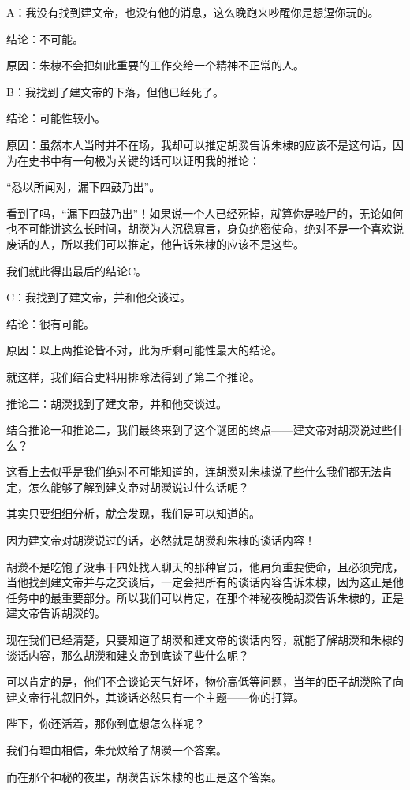 \begin{multicols}{\theparacolNo}
A：我没有找到建文帝，也没有他的消息，这么晚跑来吵醒你是想逗你玩的。

结论：不可能。

原因：朱棣不会把如此重要的工作交给一个精神不正常的人。

B：我找到了建文帝的下落，但他已经死了。

结论：可能性较小。

原因：虽然本人当时并不在场，我却可以推定胡濙告诉朱棣的应该不是这句话，因为在史书中有一句极为关键的话可以证明我的推论：

“悉以所闻对，漏下四鼓乃出”。

看到了吗，“漏下四鼓乃出”！如果说一个人已经死掉，就算你是验尸的，无论如何也不可能讲这么长时间，胡濙为人沉稳寡言，身负绝密使命，绝对不是一个喜欢说废话的人，所以我们可以推定，他告诉朱棣的应该不是这些。

我们就此得出最后的结论C。

C：我找到了建文帝，并和他交谈过。

结论：很有可能。

原因：以上两推论皆不对，此为所剩可能性最大的结论。

就这样，我们结合史料用排除法得到了第二个推论。

推论二：胡濙找到了建文帝，并和他交谈过。

结合推论一和推论二，我们最终来到了这个谜团的终点——建文帝对胡濙说过些什么？

这看上去似乎是我们绝对不可能知道的，连胡濙对朱棣说了些什么我们都无法肯定，怎么能够了解到建文帝对胡濙说过什么话呢？

其实只要细细分析，就会发现，我们是可以知道的。

因为建文帝对胡濙说过的话，必然就是胡濙和朱棣的谈话内容！

胡濙不是吃饱了没事干四处找人聊天的那种官员，他肩负重要使命，且必须完成，当他找到建文帝并与之交谈后，一定会把所有的谈话内容告诉朱棣，因为这正是他任务中的最重要部分。所以我们可以肯定，在那个神秘夜晚胡濙告诉朱棣的，正是建文帝告诉胡濙的。

现在我们已经清楚，只要知道了胡濙和建文帝的谈话内容，就能了解胡濙和朱棣的谈话内容，那么胡濙和建文帝到底谈了些什么呢？

可以肯定的是，他们不会谈论天气好坏，物价高低等问题，当年的臣子胡濙除了向建文帝行礼叙旧外，其谈话必然只有一个主题——你的打算。

陛下，你还活着，那你到底想怎么样呢？

我们有理由相信，朱允炆给了胡濙一个答案。

而在那个神秘的夜里，胡濙告诉朱棣的也正是这个答案。


\end{multicols}
